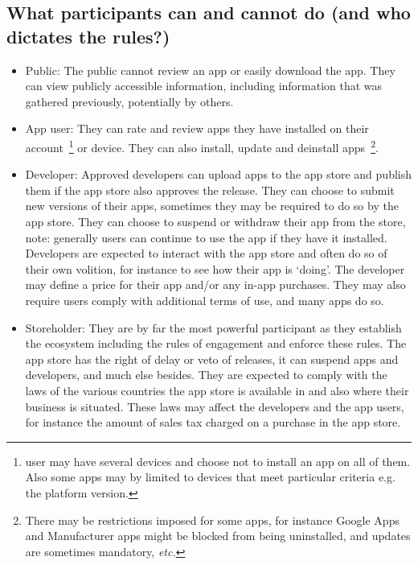 \subsection{What participants can and cannot do (and who dictates the rules?)}
\begin{itemize}
    \item Public: The public cannot review an app or easily download the app. They can view publicly accessible information, including information that was gathered previously, potentially by others.
    \item App user: They can rate and review apps they have installed on their account~\footnote{ user may have several devices and choose not to install an app on all of them. Also some apps may by limited to devices that meet particular criteria e.g. the platform version.} or device. They can also install, update and deinstall apps~\footnote{There may be restrictions imposed for some apps, for instance Google Apps and Manufacturer apps might be blocked from being uninstalled, and updates are sometimes mandatory, \emph{etc.}}.
    \item Developer:  Approved developers can upload apps to the app store and publish them if the app store also approves the release. They can choose to submit new versions of their apps, sometimes they may be required to do so by the app store. They can choose to suspend or withdraw their app from the store, note: generally users can continue to use the app if they have it installed. Developers are expected to interact with the app store and often do so of their own volition, for instance to see how their app is `doing'. The developer may define a price for their app and/or any in-app purchases. They may also require users comply with additional terms of use, and many apps do so.
    \item Storeholder: They are by far the most powerful participant as they establish the ecosystem including the rules of engagement and enforce these rules. The app store has the right of delay or veto of releases, it can suspend apps and developers, and much else besides. They are expected to comply with the laws of the various countries the app store is available in and also where their business is situated. These laws may affect the developers and the app users, for instance the amount of sales tax charged on a purchase in the app store.
\end{itemize}

